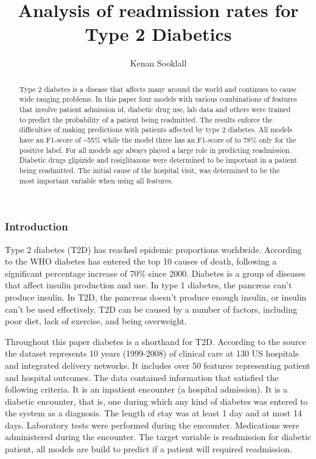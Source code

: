 \documentclass[5p]{elsarticle} %
\begin{document}
\begin{frontmatter}

  \title{Analysis of readmission rates for Type 2 Diabetics}
    \author[CUNY-SPS]{Kenan Sooklall}
  
  \begin{abstract}
  Type 2 diabetes is a disease that affects many around the world and
  continues to cause wide ranging problems. In this paper four models
  with various combinations of features that involve patient admission
  id, diabetic drug use, lab data and others were trained to predict the
  probability of a patient being readmitted. The results enforce the
  difficulties of making predictions with patients affected by type 2
  diabetes. All models have an F1-score of \textasciitilde55\% while the
  model three has an F1-score of to 78\% only for the positive label.
  For all models age always played a large role in predicting
  readmission. Diabetic drugs glipizide and rosiglitazone were
  determined to be important in a patient being readmitted. The initial
  cause of the hospital visit, was determined to be the most important
  variable when using all features.
  \end{abstract}
  
 \end{frontmatter}

\hypertarget{introduction}{%
\subsubsection{Introduction}\label{introduction}}

Type 2 diabetes (T2D) has reached epidemic proportions worldwide.
According to the WHO diabetes has entered the top 10 causes of death,
following a significant percentage increase of 70\% since 2000. Diabetes
is a group of diseases that affect insulin production and use. In type 1
diabetes, the pancreas can't produce insulin. In T2D, the pancreas
doesn't produce enough insulin, or insulin can't be used effectively.
T2D can be caused by a number of factors, including poor diet, lack of
exercise, and being overweight.

Throughout this paper diabetes is a shorthand for T2D. According to the
source the dataset represents 10 years (1999-2008) of clinical care at
130 US hospitals and integrated delivery networks. It includes over 50
features representing patient and hospital outcomes. The data contained
information that satisfied the following criteria. It is an inpatient
encounter (a hospital admission). It is a diabetic encounter, that is,
one during which any kind of diabetes was entered to the system as a
diagnosis. The length of stay was at least 1 day and at most 14 days.
Laboratory tests were performed during the encounter. Medications were
administered during the encounter. The target variable is readmission
for diabetic patient, all models are build to predict if a patient will
required readmission.
\end{document}
